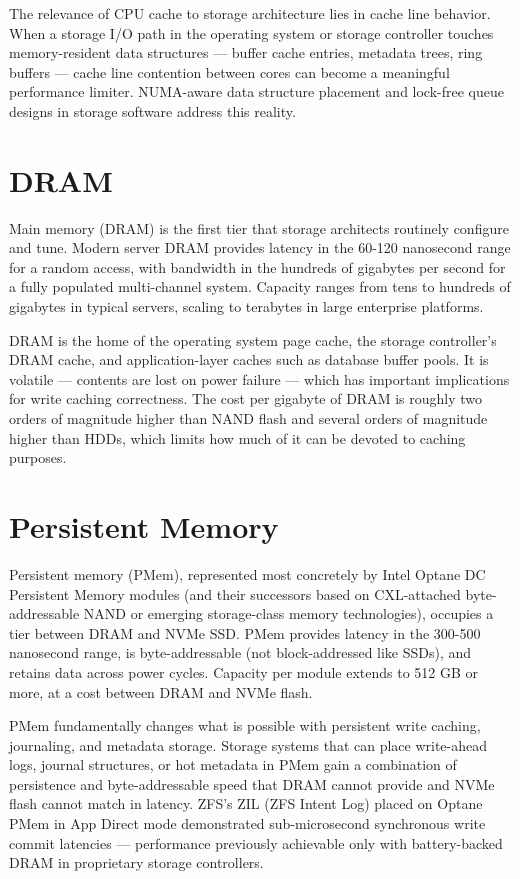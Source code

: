 The relevance of CPU cache to storage architecture lies in cache line behavior. When a storage I/O path in the operating system or storage controller touches memory-resident data structures --- buffer cache entries, metadata trees, ring buffers --- cache line contention between cores can become a meaningful performance limiter. NUMA-aware data structure placement and lock-free queue designs in storage software address this reality.

\section{DRAM}
Main memory (DRAM) is the first tier that storage architects routinely configure and tune. Modern server DRAM provides latency in the 60-120 nanosecond range for a random access, with bandwidth in the hundreds of gigabytes per second for a fully populated multi-channel system. Capacity ranges from tens to hundreds of gigabytes in typical servers, scaling to terabytes in large enterprise platforms.

DRAM is the home of the operating system page cache, the storage controller's DRAM cache, and application-layer caches such as database buffer pools. It is volatile --- contents are lost on power failure --- which has important implications for write caching correctness. The cost per gigabyte of DRAM is roughly two orders of magnitude higher than NAND flash and several orders of magnitude higher than HDDs, which limits how much of it can be devoted to caching purposes.

\section{Persistent Memory}
Persistent memory (PMem), represented most concretely by Intel Optane DC Persistent Memory modules (and their successors based on CXL-attached byte-addressable NAND or emerging storage-class memory technologies), occupies a tier between DRAM and NVMe SSD. PMem provides latency in the 300-500 nanosecond range, is byte-addressable (not block-addressed like SSDs), and retains data across power cycles. Capacity per module extends to 512 GB or more, at a cost between DRAM and NVMe flash.

PMem fundamentally changes what is possible with persistent write caching, journaling, and metadata storage. Storage systems that can place write-ahead logs, journal structures, or hot metadata in PMem gain a combination of persistence and byte-addressable speed that DRAM cannot provide and NVMe flash cannot match in latency. ZFS's ZIL (ZFS Intent Log) placed on Optane PMem in App Direct mode demonstrated sub-microsecond synchronous write commit latencies --- performance previously achievable only with battery-backed DRAM in proprietary storage controllers.

